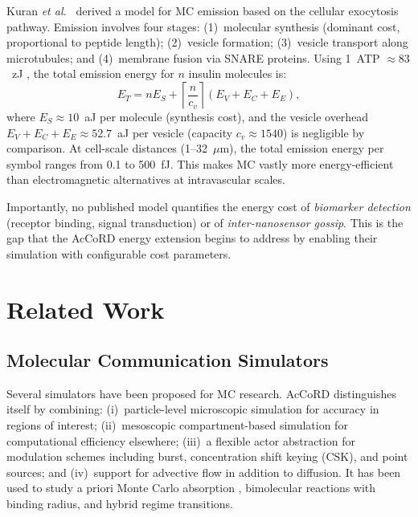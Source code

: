 \documentclass[journal]{IEEEtran}
\begin{document}
Kuran \emph{et al.}\ \cite{kuran2010energy} derived a model for
MC emission based on the cellular exocytosis pathway. Emission involves four
stages: (1)~molecular synthesis (dominant cost, proportional to peptide
length); (2)~vesicle formation; (3)~vesicle transport along microtubules;
and (4)~membrane fusion via SNARE proteins. Using 1~ATP $\approx 83$~zJ
\cite{freitas1999nanomedicine}, the total emission energy for $n$ insulin
molecules is:
\begin{equation}
  E_T = n E_S + \left\lceil \frac{n}{c_v} \right\rceil (E_V + E_C + E_E),
  \label{eq:kuran}
\end{equation}
where $E_S \approx 10$~aJ per molecule (synthesis cost), and the vesicle
overhead $E_V + E_C + E_E \approx 52.7$~aJ per vesicle (capacity
$c_v \approx 1540$) is negligible by comparison. At cell-scale distances
(1--32~$\mu$m), the total emission energy per symbol ranges from 0.1 to
500~fJ. This makes MC vastly more energy-efficient than electromagnetic
alternatives at intravascular scales.

Importantly, no published model quantifies the energy cost of
\emph{biomarker detection} (receptor binding, signal transduction) or of
\emph{inter-nanosensor gossip}. This is the gap that the AcCoRD energy
extension begins to address by enabling their simulation with configurable
cost parameters.

\section{Related Work}
\label{sec:related}

\subsection{Molecular Communication Simulators}

Several simulators have been proposed for MC research.
AcCoRD \cite{noel2017accord} distinguishes itself by combining: (i)~particle-level
microscopic simulation for accuracy in regions of interest; (ii)~mesoscopic
compartment-based simulation for computational efficiency elsewhere;
(iii)~a flexible actor abstraction for modulation schemes including burst,
concentration shift keying (CSK), and point sources; and (iv)~support for
advective flow in addition to diffusion. It has been used to study
a priori Monte Carlo absorption \cite{noel2017accord}, bimolecular reactions
with binding radius, and hybrid regime transitions.
\end{document}
